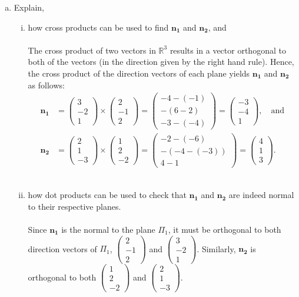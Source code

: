 \documentclass{amsart}
\renewcommand{\vec}{\mathbf}
\newcommand{\cvec}[1]{ \begin{pmatrix} #1 \end{pmatrix} }
\begin{document}
\begin{enumerate}[(a)]
	\item Explain,
		\begin{enumerate}[(i)]
			\item how cross products can be used to find $\vec{n_1}$ and $\vec{n_2}$, and
				\\ \\
				The cross product of two vectors in $\mathbb{R}^3$ results in a vector orthogonal to both of the vectors (in the direction given by the right hand rule). Hence, the cross product of the direction vectors of each plane yields $\vec{n_1}$ and $\vec{n_2}$ as follows:
				\begin{align*}
					\vec{n_1} &= \cvec{3\\-2\\1} \times \cvec{2\\-1\\2} = \cvec{-4-(-1)\\-(6-2)\\-3-(-4)} = \cvec{-3\\-4\\1}, \quad \text{and}	\\
					\vec{n_2} &= \cvec{2\\1\\-3} \times \cvec{1\\2\\-2} = \cvec{-2-(-6)\\-(-4-(-3))\\4-1} = \cvec{4\\1\\3}.
				\end{align*}
				\\

			\item how dot products can be used to check that $\vec{n_1}$ and $\vec{n_2}$ are indeed normal to their respective planes.
				\\ \\
				Since $\vec{n_1}$ is the normal to the plane $\Pi_1$, it must be orthogonal to both direction vectors of $\Pi_1$, $\cvec{2\\-1\\2}$ and $\cvec{3\\-2\\1}$. Similarly, $\vec{n_2}$ is orthogonal to both $\cvec{1\\2\\-2}$ and $\cvec{2\\1\\-3}$.


\end{enumerate}
\end{enumerate}
\end{document}
